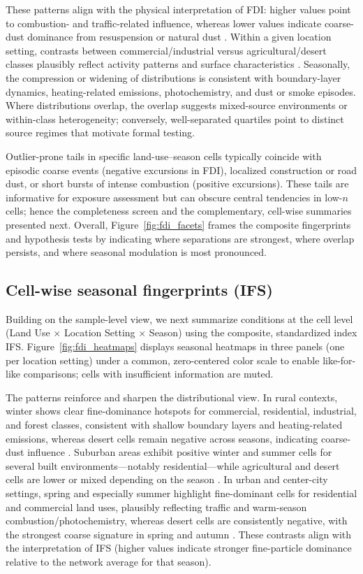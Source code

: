 \documentclass[a4paper,fleqn]{cas-sc}
\begin{document}
These patterns align with the physical interpretation of FDI: higher values point to combustion- and traffic-related influence, whereas lower values indicate coarse-dust dominance from resuspension or natural dust \citep{Liu2023, Xu2020}. Within a given location setting, contrasts between commercial/industrial versus agricultural/desert classes plausibly reflect activity patterns and surface characteristics \citep{Wei2021, Clark2013}. Seasonally, the compression or widening of distributions is consistent with boundary-layer dynamics, heating-related emissions, photochemistry, and dust or smoke episodes. Where distributions overlap, the overlap suggests mixed-source environments or within-class heterogeneity; conversely, well-separated quartiles point to distinct source regimes that motivate formal testing.

Outlier-prone tails in specific land-use–season cells typically coincide with episodic coarse events (negative excursions in FDI), localized construction or road dust, or short bursts of intense combustion (positive excursions). These tails are informative for exposure assessment but can obscure central tendencies in low-$n$ cells; hence the completeness screen and the complementary, cell-wise summaries presented next. Overall, Figure~\ref{fig:fdi_facets} frames the composite fingerprints and hypothesis tests by indicating where separations are strongest, where overlap persists, and where seasonal modulation is most pronounced.

\subsection{Cell-wise seasonal fingerprints (IFS)}

Building on the sample-level view, we next summarize conditions at the cell level (Land Use $\times$ Location Setting $\times$ Season) using the composite, standardized index IFS. Figure~\ref{fig:fdi_heatmaps} displays seasonal heatmaps in three panels (one per location setting) under a common, zero-centered color scale to enable like-for-like comparisons; cells with insufficient information are muted.

The patterns reinforce and sharpen the distributional view. In rural contexts, winter shows clear fine-dominance hotspots for commercial, residential, industrial, and forest classes, consistent with shallow boundary layers and heating-related emissions, whereas desert cells remain negative across seasons, indicating coarse-dust influence \citep{Jandacka2024, Yu2021, Czernecki2021}. Suburban areas exhibit positive winter and summer cells for several built environments—notably residential—while agricultural and desert cells are lower or mixed depending on the season \citep{Bell2007, Burns2023}. In urban and center-city settings, spring and especially summer highlight fine-dominant cells for residential and commercial land uses, plausibly reflecting traffic and warm-season combustion/photochemistry, whereas desert cells are consistently negative, with the strongest coarse signature in spring and autumn \citep{Clements2016}. These contrasts align with the interpretation of IFS (higher values indicate stronger fine-particle dominance relative to the network average for that season).
\end{document}
